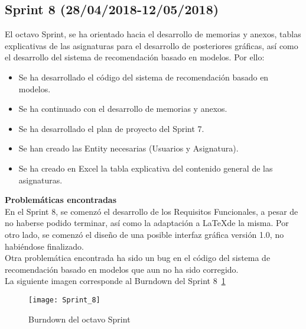 \subsection{\textbf{Sprint 8} (28/04/2018-12/05/2018) }
El octavo  Sprint, se ha orientado hacia el desarrollo de memorias y anexos, tablas explicativas de las asignaturas para el desarrollo de posteriores gráficas, así como el desarrollo del sistema de recomendación basado en modelos. 
Por ello: 
\begin{itemize}
\item Se ha desarrollado el código del sistema de recomendación basado en modelos. 
\item Se ha continuado con el desarrollo de memorias y anexos. 
\item Se ha desarrollado el plan de proyecto del Sprint 7.
\item Se han creado las Entity necesarias (Usuarios  y Asignatura). 
\item Se ha creado en Excel la tabla explicativa del contenido general de las asignaturas. 
\end{itemize}
\textbf{Problemáticas encontradas}\\En el Sprint 8, se comenzó el desarrollo de los Requisitos Funcionales, a pesar de no haberse podido terminar, así como la adaptación a \LaTeX de la misma. Por otro lado, se comenzó el diseño de una posible interfaz gráfica versión 1.0, no habiéndose finalizado. \\Otra problemática encontrada ha sido un bug en el código del sistema de recomendación basado en modelos que aun no ha sido corregido. 
 \\La siguiente imagen corresponde al Burndown del Sprint 8~\ref{fig:A.2.8}
\begin{figure}[h]
\centering
\texttt{[image: Sprint\_8]}
\caption{Burndown del octavo Sprint}
\label{fig:A.2.8}
\end{figure}
\\

